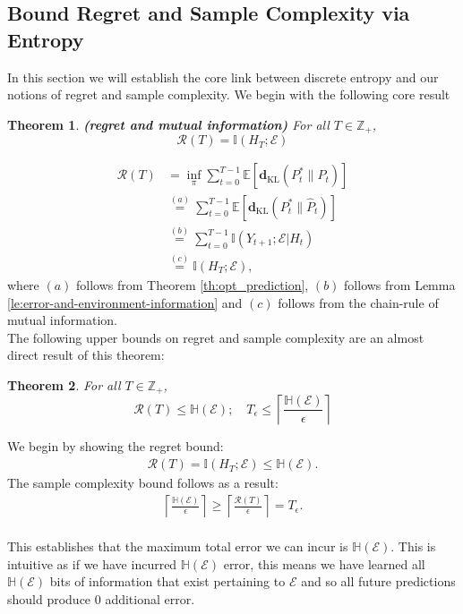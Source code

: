\documentclass[twoside,11pt]{article}
\renewenvironment{proof}{\par\noindent{\bf Proof\ }}{\hfill\BlackBox\\[2mm]}
\newenvironment{proof}{\par\noindent{\bf Proof\ }}{\hfill\BlackBox\\[2mm]}
\newtheorem{theorem}{Theorem}
\def\environment{\mathcal{E}}
\def\regret{\mathcal{R}}
\def\KL{\mathbf{d}_{\mathrm{KL}}}
\def\E{\mathbb{E}}
\def\H{\mathbb{H}}
\def\I{\mathbb{I}}
\begin{document}
\subsection{Bound Regret and Sample Complexity via Entropy}
In this section we will establish the core link between discrete entropy and our notions of regret and sample complexity. We begin with the following core result
\begin{theorem}{\bf (regret and mutual information)}
    For all $T\in\mathbb{Z}_{+}$,
    $$\regret(T) = \I(H_T;\environment)$$
\end{theorem}
\begin{proof}
    \begin{align*}
        \regret(T)
        & = \inf_{\pi} \sum_{t=0}^{T-1}\E\left[\KL(P_t^*\|P_t)\right]\\
        & \overset{(a)}{=} \sum_{t=0}^{T-1}\E\left[\KL(P_t^*\|\hat{P}_t)\right]\\
        & \overset{(b)}{=} \sum_{t=0}^{T-1}\I(Y_{t+1};\environment|H_t)\\
        & \overset{(c)}{=} \I(H_T;\environment),
    \end{align*}
    where $(a)$ follows from Theorem \ref{th:opt_prediction}, $(b)$ follows from Lemma \ref{le:error-and-environment-information} and $(c)$ follows from the chain-rule of mutual information.
\end{proof}
The following upper bounds on regret and sample complexity are an almost direct result of this theorem:
\begin{theorem}
    \label{th:entropy_bounds}
    For all $T\in\mathbb{Z}_+$,
    $$\regret(T) \leq \H(\environment);\quad T_\epsilon\leq \left\lceil\frac{\H(\environment)}{\epsilon}\right\rceil$$
\end{theorem}
\begin{proof}
    We begin by showing the regret bound: 
    \begin{align*}
        \regret(T) = \I(H_T;\environment) \leq \H(\environment).
    \end{align*}
    The sample complexity bound follows as a result:
    \begin{align*}
        \left\lceil\frac{\H(\environment)}{\epsilon}\right\rceil \geq \left\lceil\frac{\regret(T)}{\epsilon}\right\rceil = T_\epsilon.
    \end{align*}
\end{proof}
This establishes that the maximum total error we can incur is $\H(\environment)$. This is intuitive as if we have incurred $\H(\environment)$ error, this means we have learned all $\H(\environment)$ bits of information that exist pertaining to $\environment$ and so all future predictions should produce $0$ additional error.
\end{document}
